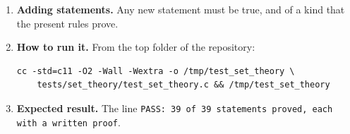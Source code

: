 \documentclass[11pt,a4paper]{article}
\begin{document}
\begin{enumerate}
\item \textbf{Adding statements.} Any new statement must be true, and of a kind that the present rules prove.

\item \textbf{How to run it.} From the top folder of the repository:
\begin{verbatim}
cc -std=c11 -O2 -Wall -Wextra -o /tmp/test_set_theory \
    tests/set_theory/test_set_theory.c && /tmp/test_set_theory
\end{verbatim}

\item \textbf{Expected result.} The line \texttt{PASS: 39 of 39 statements proved, each with a written proof}.
\end{enumerate}
\end{document}
